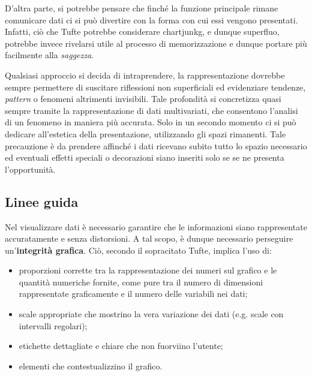 D'altra parte, si potrebbe pensare che finché la funzione principale rimane comunicare dati ci si può divertire con la forma con cui essi vengono presentati. Infatti, ciò che Tufte potrebbe considerare \gls{chartjunkg}, e dunque superfluo,
potrebbe invece rivelarsi utile al processo di memorizzazione e dunque portare più facilmente alla \emph{saggezza}. 

Qualsiasi approccio si decida di intraprendere, la rappresentazione dovrebbe sempre permettere di suscitare riflessioni non superficiali ed evidenziare tendenze, \emph{pattern} 
o fenomeni altrimenti invisibili. Tale profondità si concretizza quasi sempre tramite la rappresentazione di dati multivariati, che consentono l'analisi di un fenomeno in maniera più accurata.
Solo in un secondo momento ci si può dedicare all'estetica della presentazione, utilizzando gli spazi rimanenti. Tale precauzione è da prendere affinché i dati ricevano subito tutto lo spazio necessario ed eventuali
effetti speciali o decorazioni siano inseriti solo se se ne presenta l'opportunità.


\subsection{Linee guida}
Nel visualizzare dati è necessario garantire che le informazioni siano rappresentate accuratamente e senza distorsioni.
A tal scopo, è dunque necessario perseguire un'\textbf{integrità grafica}. Ciò, secondo il sopracitato Tufte, implica l'uso di:
\begin{itemize}
    \item proporzioni corrette tra la rappresentazione dei numeri sul grafico e le quantità numeriche fornite, come pure tra il 
    numero di dimensioni rappresentate graficamente e il numero delle variabili nei dati;
    \item scale appropriate che mostrino la vera variazione dei dati (e.g. scale con intervalli regolari);
    \item etichette dettagliate e chiare che non fuorviino l'utente;
    \item elementi che contestualizzino il grafico.
\end{itemize}

